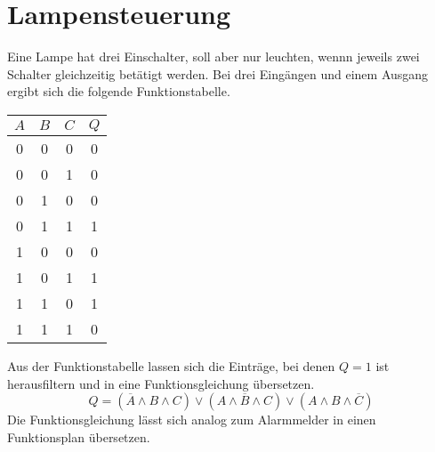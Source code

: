 \documentclass[
a4paper,     %
 headsepline, %
11pt         %
]{scrartcl}  %
\begin{document}
\section{Lampensteuerung}
Eine Lampe hat drei Einschalter, soll aber nur leuchten, wennn jeweils zwei Schalter gleichzeitig betätigt werden. Bei drei Eingängen und einem Ausgang ergibt sich die folgende Funktionstabelle.
\begin{center}
\begin{tabular}{c | c | c | c}
$A$ & $B$ & $C$ & $Q$ \\ \hline
0 & 0 & 0 & 0 \\ \hline
0 & 0 & 1 & 0 \\ \hline
0 & 1 & 0 & 0 \\ \hline
0 & 1 & 1 & 1 \\ \hline
1 & 0 & 0 & 0 \\ \hline
1 & 0 & 1 & 1 \\ \hline
1 & 1 & 0 & 1 \\ \hline
1 & 1 & 1 & 0 \\ \hline
\end{tabular}
\end{center}
Aus der Funktionstabelle lassen sich die Einträge, bei denen $Q=1$ ist herausfiltern und in eine Funktionsgleichung übersetzen.
\[Q=(\overline{A} \land B \land C ) \lor (A \land \overline{B} \land C) \lor (A \land B \land \overline{C})\]
Die Funktionsgleichung lässt sich analog zum Alarmmelder in einen Funktionsplan übersetzen.
\end{document}
